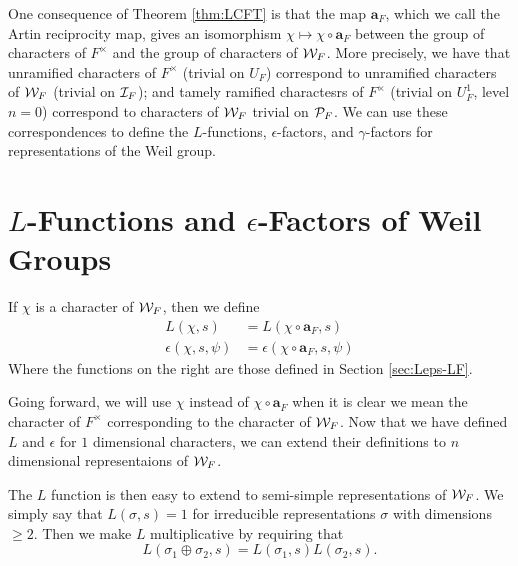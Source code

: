 One consequence of Theorem \ref{thm:LCFT} is that the map $\bm{a}_F$, which we call the Artin reciprocity map, gives an isomorphism $\chi \mapsto \chi \circ \bm{a}_F$ between the group of characters of $F^\times$ and the group of characters of $\mathcal{W}_F$.
More precisely, we have that unramified characters of $F^\times$ (trivial on $U_F$) correspond to unramified characters of $\mathcal{W}_F$ (trivial on $\mathcal{I}_F$); and tamely ramified charactesrs of $F^\times$ (trivial on $U_F^1$, level $n=0$) correspond to characters of $\mathcal{W}_F$ trivial on $\mathcal{P}_F$.
We can use these correspondences to define the $L$-functions, $\epsilon$-factors, and $\gamma$-factors for representations of the Weil group.

\section{$L$-Functions and $\epsilon$-Factors of Weil Groups}
\label{sec:Leps-weil-group}
\begin{defn}
  If $\chi$ is a character of $\mathcal{W}_F$, then we define
  \begin{align*}
    L(\chi, s) &= L(\chi \circ \bm{a}_F, s) \\
    \epsilon(\chi, s, \psi) &= \epsilon(\chi \circ \bm{a}_F, s, \psi)
  \end{align*}
  Where the functions on the right are those defined in Section \ref{sec:Leps-LF}.
\end{defn}
Going forward, we will use $\chi$ instead of $\chi \circ \bm{a}_F$ when it is clear we mean the character of $F^\times$ corresponding to the character of $\mathcal{W}_F$.
Now that we have defined $L$ and $\epsilon$ for $1$ dimensional characters, we can extend their definitions to $n$ dimensional representaions of $\mathcal{W}_F$.

The $L$ function is then easy to extend to semi-simple representations of $\mathcal{W}_F$.
We simply say that $L(\sigma,s) = 1$ for irreducible representations $\sigma$ with dimensions $\geq 2$.
Then we make $L$ multiplicative by requiring that
\[L(\sigma_1 \oplus \sigma_2,s) = L(\sigma_1,s)L(\sigma_2,s).\]
\\

